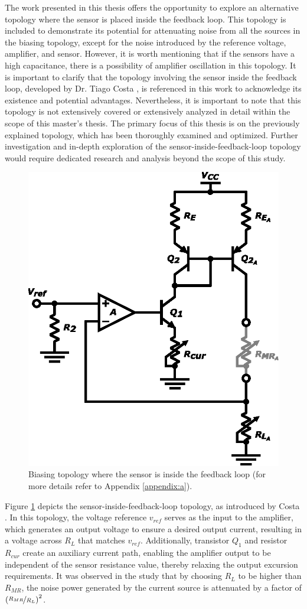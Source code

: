 
\noindent
The work presented in this thesis offers the opportunity to explore an alternative topology where the sensor is placed inside the feedback loop. This topology is included to demonstrate its potential for attenuating noise from all the sources in the biasing topology, except for the noise introduced by the reference voltage, amplifier, and sensor. However, it is worth mentioning that if the sensors have a high capacitance, there is a possibility of amplifier oscillation in this topology. It is important to clarify that the topology involving the sensor inside the feedback loop, developed by Dr. Tiago Costa \cite{6418507}, is referenced in this work to acknowledge its existence and potential advantages. Nevertheless, it is important to note that this topology is not extensively covered or extensively analyzed in detail within the scope of this master's thesis. The primary focus of this thesis is on the previously explained topology, which has been thoroughly examined and optimized. Further investigation and in-depth exploration of the sensor-inside-feedback-loop topology would require dedicated research and analysis beyond the scope of this study.

\begin{figure}[!ht]
    \centering
    \includegraphics[width=.35\textwidth]{images/chapter_4/channel/bias_closedloop.eps}
    \caption{Biasing topology where the sensor is inside the feedback loop (for more details refer to Appendix \ref{appendix:a}).}
    \label{figure:bias-closedloop}
\end{figure}

\noindent
Figure \ref{figure:bias-closedloop} depicts the sensor-inside-feedback-loop topology, as introduced by Costa \cite{6418507}. In this topology, the voltage reference $v_{ref}$ serves as the input to the amplifier, which generates an output voltage to ensure a desired output current, resulting in a voltage across $R_{L}$ that matches $v_{ref}$. Additionally, transistor $Q_1$ and resistor $R_{cur}$ create an auxiliary current path, enabling the amplifier output to be independent of the sensor resistance value, thereby relaxing the output excursion requirements. It was observed in the study that by choosing $R_{L}$ to be higher than $R_{MR}$, the noise power generated by the current source is attenuated by a factor of $\left(\nicefrac{R_{MR}}{R_{L}}\right)^2$. 

